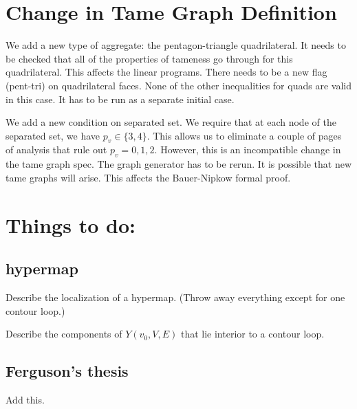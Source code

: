 \section{Change in Tame Graph Definition}

We add a new type of aggregate: the pentagon-triangle quadrilateral.
It needs to be checked that all of the properties of tameness go
through for this quadrilateral.  This affects the linear programs.
There needs to be a new flag (pent-tri) on quadrilateral faces.
None of the other inequalities for quads are valid in this case.
It has to be run as a separate initial case.

We add a new condition on separated set.  We require that 
at each node of the separated set, we have $p_v\in\{3,4\}$.
This allows us to eliminate a couple of pages of analysis
that rule out $p_v=0,1,2$.  However, this is an incompatible
change in the tame graph spec.  The graph generator has to
be rerun.  It is possible that new tame graphs will arise.
This affects the Bauer-Nipkow formal proof.

\section{Things to do:}

\subsection{hypermap}
Describe the localization of a hypermap.  (Throw away everything
except for one contour loop.)

Describe the components of $Y(v_0,V,E)$ that lie interior to
a contour loop.  


\subsection{Ferguson's thesis}

Add this.



